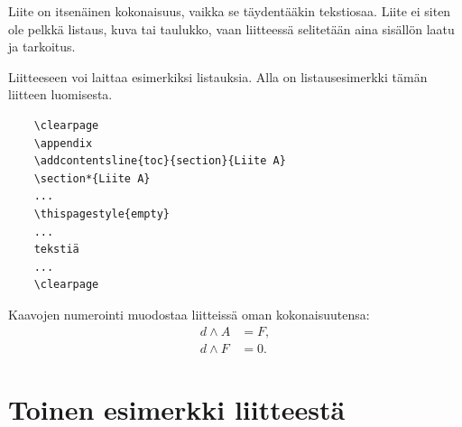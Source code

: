 \documentclass[finnish, 12pt, a4paper, elec, utf8, a-1b, online]{aaltothesis}
\begin{document}
Liite on itsenäinen kokonaisuus, vaikka se täydentääkin tekstiosaa.
Liite ei siten ole pelkkä listaus, kuva tai taulukko, vaan
liitteessä selitetään aina sisällön laatu ja tarkoitus.

Liitteeseen voi laittaa esimerkiksi listauksia. Alla on
listausesimerkki tämän liitteen luomisesta.

\begin{verbatim}
	\clearpage
	\appendix
	\addcontentsline{toc}{section}{Liite A}
	\section*{Liite A}
	...
	\thispagestyle{empty}
	...
	tekstiä
	...
	\clearpage
\end{verbatim}

Kaavojen numerointi muodostaa liitteissä oman kokonaisuutensa:
\begin{align}
d \wedge A &= F, \label{liitekaava1}\\
d \wedge F &= 0. \label{liitekaava2}
\end{align}


\clearpage
\section{Toinen esimerkki liitteestä\label{LiiteB}}

\end{document}
